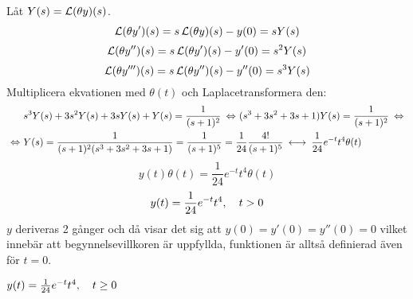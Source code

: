 \pagebreak
\begin{task}{5.7}
	Låt $Y(s)=\operatorname{\mathcal{L}}(\theta y)(s)$.
	\[\operatorname{\mathcal{L}}(\theta y')(s)=s\operatorname{\mathcal{L}}(\theta y)(s)-y(0)=sY(s)\]
	\[\operatorname{\mathcal{L}}(\theta y'')(s)=s\operatorname{\mathcal{L}}(\theta y')(s)-y'(0)=s^2Y(s)\]
	\[\operatorname{\mathcal{L}}(\theta y''')(s)=s\operatorname{\mathcal{L}}(\theta y'')(s)-y''(0)=s^3Y(s)\]
	Multiplicera ekvationen med $\theta(t)$ och Laplacetransformera den:
	\begin{align*}
	&s^3Y(s)+3s^2Y(s)+3sY(s)+Y(s)=\frac{1}{(s+1)^2} \lra
	(s^3+3s^2+3s+1)Y(s)=\frac{1}{(s+1)^2} \lra \\ \lra
	&Y(s)=\frac{1}{(s+1)^2(s^3+3s^2+3s+1)}=
	\frac{1}{(s+1)^5}=
	\frac{1}{24}\*\frac{4!}{(s+1)^5} \llra
	\frac{1}{24}e^{-t}t^4\theta(t)
	\end{align*}
	\[y(t)\theta(t)=\frac{1}{24}e^{-t}t^4\theta(t)\]
	\[y(t)=\frac{1}{24}e^{-t}t^4, \quad t>0\]
	$y$ deriveras 2 gånger och då visar det sig att $y(0)=y'(0)=y''(0)=0$ vilket innebär att begynnelsevillkoren är uppfyllda, funktionen är alltså definierad även för $t=0$.
	
	\ans $y(t)=\frac{1}{24}e^{-t}t^4, \quad t\ge0$
\end{task}

